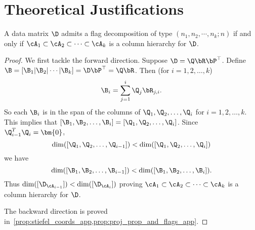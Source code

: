 \section{Theoretical Justifications}\label{sec:proofs}
\begin{prop}
    A data matrix $\D$ admits a flag decomposition of type $(n_1,n_2, \cdots, n_k; n)$ if and only if $\cA_1 \subset \cA_2 \subset \cdots \subset \cA_k$ is a column hierarchy for $\D$.
\end{prop}

\begin{proof}
    We first tackle the forward direction. Suppose $\D = \Q \bR \bP^\top$. Define $\B = [\B_1| \B_2 | \cdots | \B_k] = \D \bP^{\top} = \Q\bR$. Then (for $i=1,2,\dots,k$)
    \begin{equation}
        \B_i = \sum_{j=1}^i \Q_j \bR_{j,i}.
    \end{equation}
    So each $\B_i$ is in the span of the columns of $\Q_1,\Q_2,\dots,\Q_i$ for $i=1,2,\dots,k$. This implies that $[\B_1,\B_2,\dots,\B_i] = [\Q_1, \Q_2, \dots,\Q_i]$. Since $\Q_{i-1}^T\Q_{i} = \bm{0}$, 
    \begin{equation}
        \mathrm{dim}([\Q_1, \Q_2, \dots,\Q_{i-1}]) < \mathrm{dim}([\Q_1, \Q_2, \dots,\Q_i])
    \end{equation} 
    we have 
    \begin{equation}
        \mathrm{dim}([\B_1, \B_2, \dots,\B_{i-1}]) < \mathrm{dim}([\B_1, \B_2, \dots,\B_i]).
    \end{equation}
    Thus $\mathrm{dim}([\D_{\cA_{i-1}}]) < \mathrm{dim}([\D_{\cA_i}])$ proving $\cA_1 \subset \cA_2 \subset \cdots \subset \cA_k$ is a column hierarchy for $\D$.
    
    The backward direction is proved in~\cref{prop:stiefel_coords_app,prop:proj_prop_and_flags_app}.


\end{proof}


